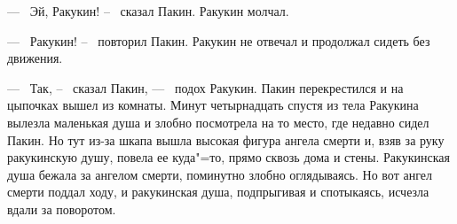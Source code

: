 	---~ Эй, Ракукин! --~ сказал Пакин. Ракукин молчал.

	---~ Ракукин! --~ повторил Пакин. Ракукин не отвечал и продолжал сидеть
	без движения.
	
	---~ Так, --~ сказал Пакин, ---~ подох Ракукин. Пакин перекрестился и на 
	цыпочках вышел из комнаты. Минут четырнадцать спустя из тела Ракукина
	вылезла маленькая душа и злобно посмотрела на то место, где недавно сидел Пакин.
	Но тут из-за шкапа вышла высокая фигура ангела смерти и, взяв за руку
	ракукинскую душу, повела ее куда"=то, прямо сквозь дома и стены.
	Ракукинская душа бежала за ангелом смерти, поминутно злобно оглядываясь. Но
	вот ангел смерти поддал ходу, и ракукинская душа, подпрыгивая и спотыкаясь,
	исчезла вдали за поворотом.